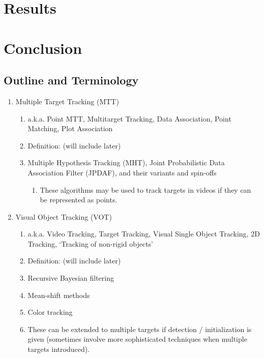 \documentclass{article}
\begin{document}
\section*{Results}




\section*{Conclusion}








\subsection*{Outline and Terminology}
\vspace{6pt}
\begin{enumerate}
\item Multiple Target Tracking (MTT)
	\begin{enumerate}
	\item a.k.a. Point MTT, Multitarget Tracking, Data Association, Point Matching, Plot Association
	\item Definition: (will include later)
	\item Multiple Hypothesis Tracking (MHT), Joint Probabilistic Data Association Filter (JPDAF), and their variants and spin-offs
		\begin{enumerate}
		\item These algorithms may be used to track targets in videos if they can be represented as points.
		\end{enumerate}
	\end{enumerate}
\item Visual Object Tracking (VOT)
	\begin{enumerate}
	\item a.k.a. Video Tracking, Target Tracking, Visual Single Object Tracking, 2D Tracking, `Tracking of non-rigid objects'
	\item Definition: (will include later)
	\item Recursive Bayesian filtering
	\item Mean-shift methods
	\item Color tracking %
	\item These can be extended to multiple targets if detection / initialization is given (sometimes involve more sophisticated techniques when multiple targets introduced).
	\end{enumerate}

\end{enumerate}
\end{document}
